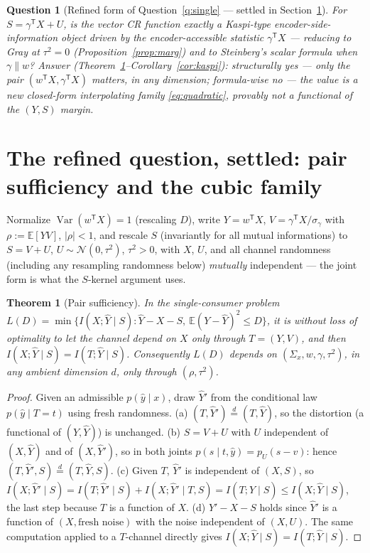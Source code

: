 \documentclass[11pt]{article}
\newtheorem{question}{Question}\newtheorem{remark}{Remark}
\newtheorem{theorem}{Theorem}\newtheorem{corollary}{Corollary}
\newcommand{\E}{\mathbb{E}}\newcommand{\tr}{\operatorname{tr}}
\newcommand{\hY}{\widehat Y}
\begin{document}
\begin{question}[Refined form of Question~\ref{q:single} --- settled in
Section~\ref{sec:refined}]\label{q:refined}
For $S=\gamma^{\mathsf T}X+U$, is the vector CR function exactly a
Kaspi-type encoder-side-information object driven by the
encoder-accessible statistic $\gamma^{\mathsf T}X$ --- reducing to Gray at
$\tau^2=0$ (Proposition~\ref{prop:marg}) and to Steinberg's scalar formula
when $\gamma\parallel w$? \emph{Answer
(Theorem~\ref{thm:pair}--Corollary~\ref{cor:kaspi}): structurally yes ---
only the pair $(w^{\mathsf T}X,\gamma^{\mathsf T}X)$ matters, in any
dimension; formula-wise no --- the value is a new closed-form interpolating
family \eqref{eq:quadratic}, provably not a functional of the $(Y,S)$
margin.}
\end{question}

\section{The refined question, settled: pair sufficiency and the cubic
family}\label{sec:refined}

Normalize $\operatorname{Var}(w^{\mathsf T}X)=1$ (rescaling $D$), write
$Y=w^{\mathsf T}X$, $V=\gamma^{\mathsf T}X/\sigma_{\gamma}$ with
$\rho:=\E[YV]$, $|\rho|<1$, and rescale $S$ (invariantly for all mutual
informations) to $S=V+U$, $U\sim\mathcal N(0,\tau^2)$, $\tau^2>0$, with $X$, $U$, and all channel
randomness (including any resampling randomness below) \emph{mutually}
independent --- the joint form is what the $S$-kernel argument uses.

\begin{theorem}[Pair sufficiency]\label{thm:pair}
In the single-consumer problem
$L(D)=\min\{I(X;\hY\mid S):\hY-X-S,\ \E(Y-\hY)^2\le D\}$, it is without
loss of optimality to let the channel depend on $X$ only through
$T=(Y,V)$, and then $I(X;\hY\mid S)=I(T;\hY\mid S)$. Consequently $L(D)$
depends on $(\Sigma_x,w,\gamma,\tau^2)$, in any ambient dimension $d$,
only through $(\rho,\tau^2)$.
\end{theorem}
\begin{proof}
Given an admissible $p(\hat y\mid x)$, draw $\hY'$ from the conditional
law $p(\hat y\mid T=t)$ using fresh randomness. (a) $(T,\hY')\overset{d}=
(T,\hY)$, so the distortion (a functional of $(Y,\hY)$) is unchanged.
(b) $S=V+U$ with $U$ independent of $(X,\hY)$ and of $(X,\hY')$, so in
both joints $p(s\mid t,\hat y)=p_U(s-v)$: hence
$(T,\hY',S)\overset{d}=(T,\hY,S)$. (c) Given $T$, $\hY'$ is independent
of $(X,S)$, so $I(X;\hY'\mid S)=I(T;\hY'\mid S)+I(X;\hY'\mid T,S)
=I(T;\hY\mid S)\le I(X;\hY\mid S)$, the last step because $T$ is a
function of $X$. (d) $\hY'-X-S$ holds since $\hY'$ is a function of
$(X,\text{fresh noise})$ with the noise independent of $(X,U)$. The same
computation applied to a $T$-channel directly gives
$I(X;\hY\mid S)=I(T;\hY\mid S)$.
\end{proof}
\end{document}
